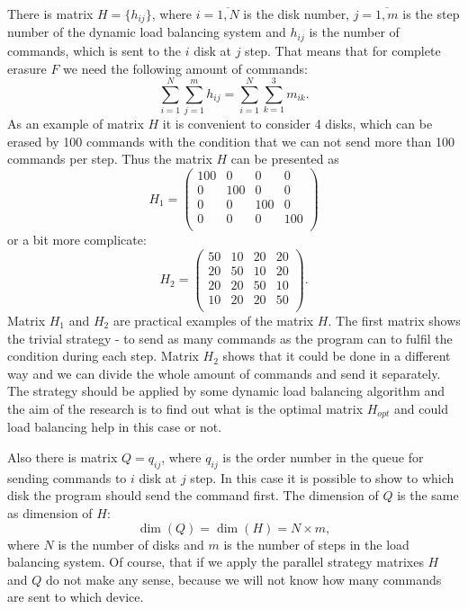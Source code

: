 There is matrix $H=\{h_{ij}\}$, where $i=\overline{1,N}$ is the disk number, $j=\overline{1,m}$ is the step number of the dynamic load balancing system and $h_{ij}$ is the number of commands, which is sent to the $i$ disk at $j$ step. That means that for complete erasure $F$ we need the following amount of commands:
\begin{equation}
\label{eq:load_balancing_matrix}
	\sum_{i=1}^{N}\sum_{j=1}^{m}h_{ij} = \sum_{i=1}^{N}\sum_{k=1}^{3}m_{ik}.
\end{equation}
As an example of matrix $H$ it is convenient to consider 4 disks, which can be erased by 100 commands with the condition that we can not send more than 100 commands per step. Thus the matrix $H$ can be presented as 
\begin{equation}
	H_1 =
	\begin{pmatrix}
		100 & 0 & 0 & 0 \\
		0 & 100 & 0 & 0 \\
		0 & 0 & 100 & 0 \\
		0 & 0 & 0 & 100 \\
	\end{pmatrix}
\end{equation}
or a bit more complicate:
\begin{equation}
	H_2 =
	\begin{pmatrix}
		50 & 10 & 20 & 20 \\
		20 & 50 & 10 & 20 \\
		20 & 20 & 50 & 10 \\
		10 & 20 & 20 & 50 \\
	\end{pmatrix}.
\end{equation}
Matrix $H_1$ and $H_2$ are practical examples of the matrix $H$. The first matrix shows the trivial strategy - to send as many commands as the program can to fulfil the condition during each step. Matrix $H_2$ shows that it could be done in a different way and we can divide the whole amount of commands and send it separately. The strategy should be applied by some dynamic load balancing algorithm and the aim of the research is to find out what is the optimal matrix $H_{opt}$ and could load balancing help in this case or not.

Also there is matrix $Q=q_{ij}$, where $q_{ij}$ is the order number in the queue for sending commands to $i$ disk at $j$ step. In this case it is possible to show to which disk the program should send the command first. The dimension of $Q$ is the same as dimension of $H$: 
\begin{equation}
	\dim(Q) = \dim(H) = N \times m,
\end{equation}
where $N$ is the number of disks and $m$ is the number of steps in the load balancing system. Of course, that if we apply the parallel strategy matrixes $H$ and $Q$ do not make any sense, because we will not know how many commands are sent to which device. 

